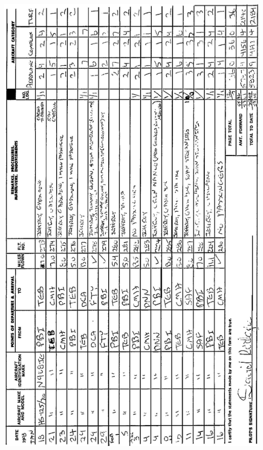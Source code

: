 \documentclass[10pt]{article}
\begin{document}
\includegraphics[max width=\textwidth, center]{2025_02_27_dd68c3d38de88f0516d9g-021}\\
\end{document}
